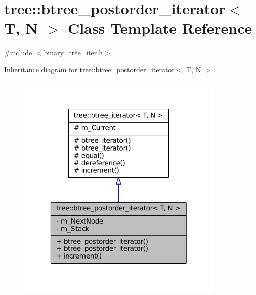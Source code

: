 \hypertarget{classtree_1_1btree__postorder__iterator}{\section{tree\-:\-:btree\-\_\-postorder\-\_\-iterator$<$ \-T, \-N $>$ \-Class \-Template \-Reference}
\label{classtree_1_1btree__postorder__iterator}
}


{\ttfamily \#include $<$binary\-\_\-tree\-\_\-iter.\-h$>$}



\-Inheritance diagram for tree\-:\-:btree\-\_\-postorder\-\_\-iterator$<$ \-T, \-N $>$\-:
\nopagebreak
\begin{figure}[H]
\begin{center}
\leavevmode
\includegraphics[width=280pt]{classtree_1_1btree__postorder__iterator__inherit__graph}
\end{center}
\end{figure}


